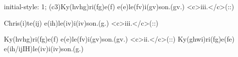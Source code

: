 initial-style: 1;
(c3)Ky(hvhg)ri(fg)e(f) e(e)le(fv)i(gv)son.(gv.) <c>iii.</c>(::)

Chris(i)te(ij) e(ih)le(iv)i(iv)son.(g.) <c>iii.</c>(::)

Ky(hvhg)ri(fg)e(f) e(e)le(fv)i(gv)son.(gv.) <c>ii.</c>(::) Ky(ghwi)ri(fg)e(fe) e(ih/ijIH)le(iv)i(iv)son.(g.)
